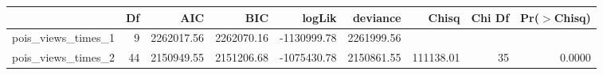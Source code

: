 \begin{table}[ht]
\centering
\begin{tabular}{lrrrrrrrr}
  \hline
 & Df & AIC & BIC & logLik & deviance & Chisq & Chi Df & Pr($>$Chisq) \\ 
  \hline
pois\_views\_times\_1 & 9 & 2262017.56 & 2262070.16 & -1130999.78 & 2261999.56 &  &  &  \\ 
  pois\_views\_times\_2 & 44 & 2150949.55 & 2151206.68 & -1075430.78 & 2150861.55 & 111138.01 & 35 & 0.0000 \\ 
   \hline
\end{tabular}
\end{table}

